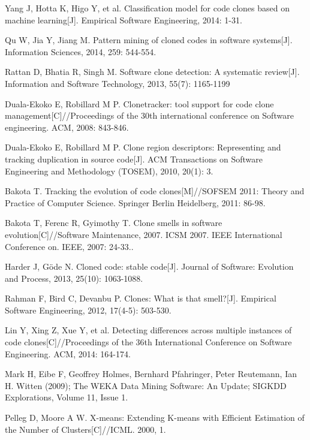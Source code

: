 \documentclass[twoside]{article}
\def\REF#1{\par\hangindent\parindent\indent\llap{#1\enspace}\ignorespaces}
\begin{document}
\begin{multicols}{2}
\REF{[15]} Yang J, Hotta K, Higo Y, et al. Classification model for code clones based on machine learning[J]. Empirical Software Engineering, 2014: 1-31.
\REF{[16]} Qu W, Jia Y, Jiang M. Pattern mining of cloned codes in software systems[J]. Information Sciences, 2014, 259: 544-554.
\REF{[17]} Rattan D, Bhatia R, Singh M. Software clone detection: A systematic review[J]. Information and Software Technology, 2013, 55(7): 1165-1199
\REF{[18]} Duala-Ekoko E, Robillard M P. Clonetracker: tool support for code clone management[C]//Proceedings of the 30th international conference on Software engineering. ACM, 2008: 843-846.
\REF{[19]} Duala-Ekoko E, Robillard M P. Clone region descriptors: Representing and tracking duplication in source code[J]. ACM Transactions on Software Engineering and Methodology (TOSEM), 2010, 20(1): 3.
\REF{[20]} Bakota T. Tracking the evolution of code clones[M]//SOFSEM 2011: Theory and Practice of Computer Science. Springer Berlin Heidelberg, 2011: 86-98.
\REF{[21]} Bakota T, Ferenc R, Gyimothy T. Clone smells in software evolution[C]//Software Maintenance, 2007. ICSM 2007. IEEE International Conference on. IEEE, 2007: 24-33.. 
\REF{[22]} Harder J, Göde N. Cloned code: stable code[J]. Journal of Software: Evolution and Process, 2013, 25(10): 1063-1088. 
\REF{[23]} Rahman F, Bird C, Devanbu P. Clones: What is that smell?[J]. Empirical Software Engineering, 2012, 17(4-5): 503-530.
\REF{[24]} Lin Y, Xing Z, Xue Y, et al. Detecting differences across multiple instances of code clones[C]//Proceedings of the 36th International Conference on Software Engineering. ACM, 2014: 164-174.
\REF{[25]}Mark H, Eibe F, Geoffrey Holmes, Bernhard Pfahringer, Peter Reutemann, Ian H. Witten (2009); The WEKA Data Mining Software: An Update; SIGKDD Explorations, Volume 11, Issue 1.
\REF{[26]} Pelleg D, Moore A W. X-means: Extending K-means with Efficient Estimation of the Number of Clusters[C]//ICML. 2000, 1.

\end{multicols} %
\end{document}
